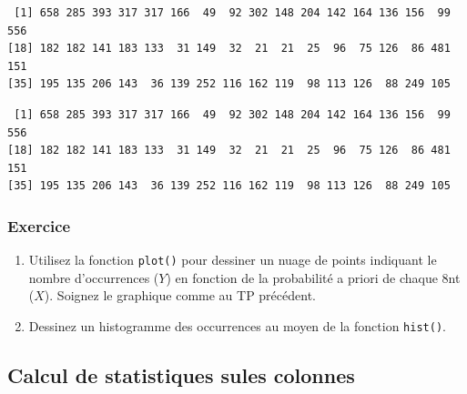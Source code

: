 \documentclass[]{article}
\newenvironment{Shaded}{\begin{snugshade}}{\end{snugshade}}
\newcommand{\KeywordTok}[1]{\textcolor[rgb]{0.94,0.87,0.69}{#1}}
\newcommand{\DataTypeTok}[1]{\textcolor[rgb]{0.87,0.87,0.75}{#1}}
\newcommand{\DecValTok}[1]{\textcolor[rgb]{0.86,0.86,0.80}{#1}}
\newcommand{\OperatorTok}[1]{\textcolor[rgb]{0.94,0.94,0.82}{#1}}
\newcommand{\NormalTok}[1]{\textcolor[rgb]{0.80,0.80,0.80}{#1}}
\begin{document}
\begin{Shaded}
\end{Shaded}

\begin{verbatim}
 [1] 658 285 393 317 317 166  49  92 302 148 204 142 164 136 156  99 556
[18] 182 182 141 183 133  31 149  32  21  21  25  96  75 126  86 481 151
[35] 195 135 206 143  36 139 252 116 162 119  98 113 126  88 249 105
\end{verbatim}

\begin{Shaded}
\end{Shaded}

\begin{verbatim}
 [1] 658 285 393 317 317 166  49  92 302 148 204 142 164 136 156  99 556
[18] 182 182 141 183 133  31 149  32  21  21  25  96  75 126  86 481 151
[35] 195 135 206 143  36 139 252 116 162 119  98 113 126  88 249 105
\end{verbatim}

\subsubsection{Exercice}\label{exercice}

\begin{enumerate}
\def\labelenumi{\arabic{enumi}.}
\item
  Utilisez la fonction \texttt{plot()} pour dessiner un nuage de points
  indiquant le nombre d'occurrences (\(Y\)) en fonction de la
  probabilité a priori de chaque 8nt (\(X\)). Soignez le graphique comme
  au TP précédent.
\item
  Dessinez un histogramme des occurrences au moyen de la fonction
  \texttt{hist()}.
\end{enumerate}

\subsection{Calcul de statistiques sules
colonnes}\label{calcul-de-statistiques-sules-colonnes}
\end{document}
